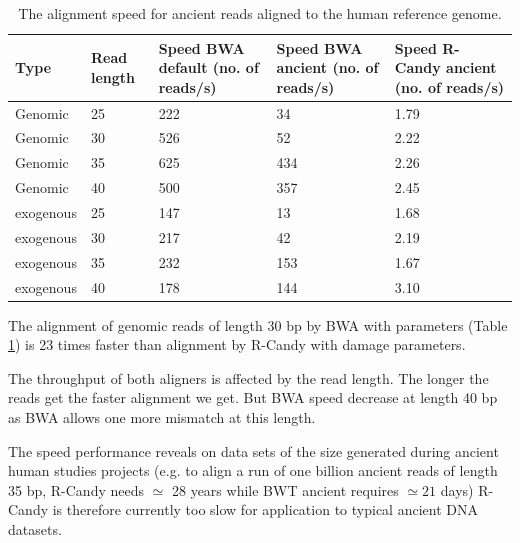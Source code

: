 \documentclass[11pt,a4paper]{report}
\begin{document}
\begin{table}[H]
  \begin{tabular}{ |  p{2cm} | p{2cm} | p{2cm} | p{2cm} |p{2cm} | }
    \hline
  	\textbf{Type} & \textbf{Read length }&\textbf{Speed BWA  
  		default (no. of reads/s) }
  	&\textbf{Speed BWA ancient (no. of reads/s)} 
  	& \textbf{Speed R-Candy ancient (no. of reads/s)}\\ \hline
 	  Genomic    & 25  & 222 &  34   &  1.79 \\ \hline
      Genomic    & 30  & 526 &  52   &  2.22 \\ \hline
      Genomic    & 35  & 625 &  434   &  2.26 \\ \hline
 	  Genomic	 & 40  & 500 &  357   &  2.45 \\ \hline
 	  exogenous  & 25  & 147 &  13   &  1.68 \\ \hline
      exogenous  & 30  & 217 &  42   &  2.19 \\ \hline
 	  exogenous  & 35  & 232 &  153   &  1.67 \\ \hline
 	  exogenous  & 40  & 178 &  144   &  3.10 \\ \hline
   \end{tabular}
\caption{The alignment speed for ancient reads aligned to 
the human reference genome.}
\label{speed-RG}
\end{table}



The alignment of genomic reads of length 30 bp by BWA with 
parameters (Table \ref{speed-RG}) is 23 times faster than alignment by R-Candy
with damage parameters.  

The throughput of both aligners is affected by the read length. The longer the
reads get the faster alignment we get. But BWA speed decrease at length 40 bp 
as BWA allows one more mismatch at this length.

The speed performance reveals on data sets of the size generated during ancient 
human studies projects (e.g. to align a run of one billion ancient reads of length
35 bp, R-Candy needs $\simeq $ 28 years while BWT ancient requires $\simeq 21$
days) R-Candy is therefore currently too slow for application to typical ancient 
DNA datasets.
\end{document}
